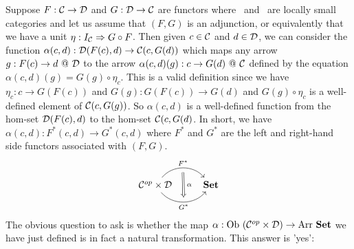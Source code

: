 Suppose $F:\mbox{$\cal C$}\to\mbox{$\cal D$}$ and $G:\mbox{$\cal D$}\to\mbox{$\cal C$}$ are functors where \Cat\ and \Dat\ 
are locally small categories and let us assume that $(F,G)$ is an adjunction, 
or equivalently that we have a unit $\eta:I_{\cal C}\Rightarrow G\circ F$. 
Then given $c\in\mbox{$\cal C$}$ and $d\in\mbox{$\cal D$}$, we can consider the function
$\alpha(c,d):\mbox{$\cal D$}(F(c),d)\to\mbox{$\cal C$}(c,G(d))$ which maps any arrow $g:F(c)\to d\ @\ 
\Dat$ to the arrow $\alpha(c,d)(g):c\to G(d)\ @\ \mbox{$\cal C$}$ defined by the equation
$\alpha(c,d)(g)=G(g)\circ\eta_{c}$. This is a valid definition since we have
$\eta_{c}:c\to G(F(c))$ and $G(g):G(F(c))\to G(d)$ and $G(g)\circ\eta_{c}$
is a well-defined element of $\mbox{$\cal C$}(c,G(g))$. So $\alpha(c,d)$ is a well-defined
function from the hom-set $\mbox{$\cal D$}(F(c),d)$ to the hom-set $\mbox{$\cal C$}(c,G(d)$. In short,
we have $\alpha(c,d):F^{*}(c,d)\to G^{*}(c,d)$ where $F^{*}$ and $G^{*}$
are the left and right-hand side functors associated with $(F,G)$. 
    \[
        \begin{tikzcd}
            \Cop\times\Dat \arrow[r, "F^{*}", bend left  = 50, ""{name=U, below}]
                 \arrow[r, swap, "G^{*}", bend right = 50, ""{name=D, above}]
              & \Set
            \arrow[Rightarrow, "\,\alpha", from = U, to = D]
        \end{tikzcd}
    \]
The obvious question to ask is whether the map $\alpha:\mbox{\rm Ob}\ (\mbox{${\cal C}^{op}$}\times\mbox{$\cal D$})
\to\mbox{\rm Arr}\ \mbox{\bf Set}$ we have just defined is in fact a natural transformation.
This answer is 'yes':

